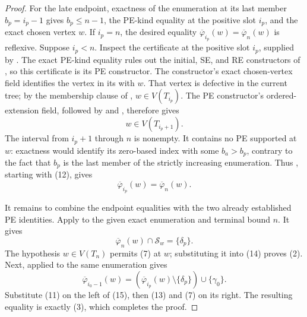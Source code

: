 \begin{proof}
For the late endpoint, exactness of the enumeration at its last member
\(b_p=i_p-1\) gives \(b_p\leq n-1\), the PE-kind equality at the positive
slot \(i_p\), and the exact chosen vertex \(w\).  If \(i_p=n\), the desired
equality
\(\overline\varphi_{i_p}(w)=\overline\varphi_n(w)\) is reflexive.
Suppose \(i_p<n\).  Inspect the certificate at the positive slot \(i_p\),
supplied by .  The exact PE-kind equality rules
out the initial, SE, and RE constructors of
, so this certificate is its PE constructor.
The constructor's exact chosen-vertex field identifies the vertex in its
 with \(w\).  That vertex is defective in
the current tree; by the membership clause of ,
\(w\in V(T_{i_p})\).  The PE constructor's ordered-extension field, followed
by  and
, therefore gives
\[
                              w\in V(T_{i_p+1}).                \tag{12}
\]
The interval from \(i_p+1\) through \(n\) is nonempty.  It contains no PE
supported at \(w\): exactness would identify its zero-based index with
some \(b_a>b_p\), contrary to the fact that \(b_p\) is the last member of
the strictly increasing enumeration.  Thus
, starting with (12), gives
\[
                  \overline\varphi_{i_p}(w)
                    =\overline\varphi_n(w).                   \tag{13}
\]

It remains to combine the endpoint equalities with the two already
established PE identities.  Apply 
to the given exact enumeration and terminal bound \(n\).  It gives
\[
                  \overline\varphi_n(w)\cap\mathcal S_w
                    =\{\delta_p\}.                            \tag{14}
\]
The hypothesis \(w\in V(T_n)\) permits (7) at \(w\); substituting it into
(14) proves (2).  Next,  applied to
the same enumeration gives
\[
 \overline\varphi_{i_0-1}(w)
   =(\overline\varphi_{i_p}(w)\setminus\{\delta_p\})
      \cup\{\gamma_0\}.                                     \tag{15}
\]
Substitute (11) on the left of (15), then (13) and (7) on its right.
The resulting equality is exactly (3), which completes the proof.
\end{proof}
